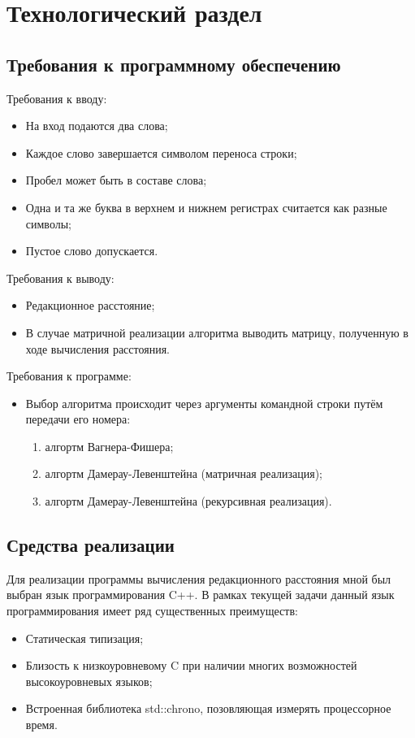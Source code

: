 \chapter{Технологический раздел}
\label{cha:impl}

\section{Требования к программному обеспечению}
Требования к вводу:
\begin{itemize}
    \item На вход подаются два слова;
    \item Каждое слово завершается символом переноса строки;
    \item Пробел может быть в составе слова;
    \item Одна и та же буква в верхнем и нижнем регистрах считается как разные символы;
    \item Пустое слово допускается.
\end{itemize}
Требования к выводу:
\begin{itemize}
    \item Редакционное расстояние;
    \item В случае матричной реализации алгоритма выводить матрицу, полученную в ходе вычисления расстояния.
\end{itemize}
Требования к программе:
\begin{itemize}
    \item Выбор алгоритма происходит через аргументы командной строки путём передачи его номера:
        \begin{enumerate}[1.]
            \item алгортм Вагнера-Фишера;
            \item алгортм Дамерау-Левенштейна (матричная реализация);
            \item алгортм Дамерау-Левенштейна (рекурсивная реализация).
        \end{enumerate}

\end{itemize}

\section{Средства реализации}
Для реализации программы вычисления редакционного расстояния мной был выбран язык программирования C++. В рамках текущей задачи данный язык программирования имеет ряд существенных преимуществ:
\begin{itemize}
    \item Статическая типизация;
    \item Близость к низкоуровневому C при наличии многих возможностей высокоуровневых языков;
    \item Встроенная библиотека std::chrono, позовляющая измерять процессорное время.
\end{itemize}

